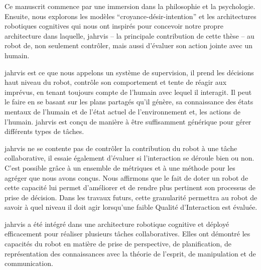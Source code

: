 \documentclass[english,a4paper,11pt,twoside]{StyleThese}
\begin{document}
Ce manuscrit commence par une immersion dans la philosophie et la psychologie. Ensuite, nous explorons les modèles ``croyance-désir-intention'' et les architectures robotiques cognitives qui nous ont inspirés pour concevoir notre propre architecture dans laquelle, \acrshort{jahrvis} -- la principale contribution de cette thèse -- au robot de, non seulement contrôler, mais aussi d'évaluer son action jointe avec un humain. 

\acrfull{jahrvis} est ce que nous appelons un système de supervision, \ie il prend les décisions haut niveau du robot, contrôle son comportement et tente de réagir aux imprévus, en tenant toujours compte de l'humain avec lequel il interagit. Il peut le faire en se basant sur les plans partagés qu’il génère, sa connaissance des états mentaux de l'humain et de l'état actuel de l'environnement et, les actions de l'humain. \acrshort{jahrvis} est conçu de manière à être suffisamment générique pour gérer différents types de tâches.

\acrshort{jahrvis} ne se contente pas de contrôler la contribution du robot à une tâche collaborative, il essaie également d'évaluer si l'interaction se déroule bien ou non. C'est possible grâce à un ensemble de métriques et à une méthode pour les agréger que nous avons conçus. Nous affirmons que le fait de doter un robot de cette capacité lui permet d'améliorer et de rendre plus pertinent son processus de prise de décision. Dans les travaux futurs, cette granularité permettra au robot de savoir à quel niveau il doit agir lorsqu'une faible Qualité d'Interaction est évaluée.

\acrshort{jahrvis} a été intégré dans une architecture robotique cognitive et déployé efficacement pour réaliser plusieurs tâches collaboratives. Elles ont démontré les capacités du robot en matière de prise de perspective, de planification, de représentation des connaissances avec la théorie de l'esprit, de manipulation et de communication.


%
%
\end{document}
